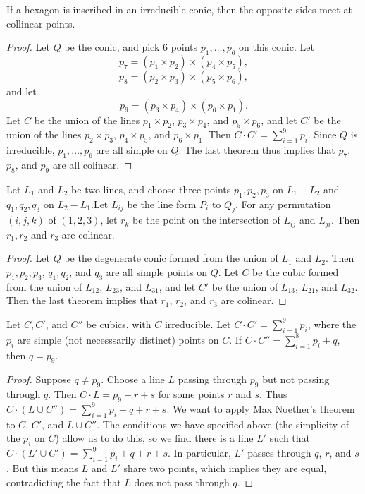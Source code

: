 \begin{corollary}
    If a hexagon is inscribed in an irreducible conic, then the opposite sides meet at collinear points.
\end{corollary}
\begin{proof}
    Let $Q$ be the conic, and pick 6 points $p_1,\dots,p_6$ on this conic. Let
    \[ p_7 = (p_1 \times p_2) \times (p_4 \times p_5), \]
    \[ p_8 = (p_2 \times p_3) \times (p_5 \times p_6), \]
    and let
    \[ p_9 = (p_3 \times p_4) \times (p_6 \times p_1). \]
    Let $C$ be the union of the lines $p_1 \times p_2$, $p_3 \times p_4$, and $p_5 \times p_6$, and let $C'$ be the union of the lines $p_2 \times p_3$, $p_4 \times p_5$, and $p_6 \times p_1$. Then $C \cdot C' = \sum_{i = 1}^9 p_i$. Since $Q$ is irreducible, $p_1,\dots,p_6$ are all simple on $Q$. The last theorem thus implies that $p_7$, $p_8$, and $p_9$ are all colinear.
\end{proof}

\begin{corollary}
    Let $L_1$ and $L_2$ be two lines, and choose three points $p_1,p_2,p_3$ on $L_1 - L_2$ and $q_1,q_2,q_3$ on $L_2 - L_1$.Let $L_{ij}$ be the line form $P_i$ to $Q_j$. For any permutation $(i,j,k)$ of $(1,2,3)$, let $r_k$ be the point on the intersection of $L_{ij}$ and $L_{ji}$. Then $r_1,r_2$ and $r_3$ are colinear.
\end{corollary}
\begin{proof}
    Let $Q$ be the degenerate conic formed from the union of $L_1$ and $L_2$. Then $p_1,p_2,p_3$, $q_1,q_2$, and $q_3$ are all simple points on $Q$. Let $C$ be the cubic formed from the union of $L_{12}$, $L_{23}$, and $L_{31}$, and let $C'$ be the union of $L_{13}$, $L_{21}$, and $L_{32}$. Then the last theorem implies that $r_1$, $r_2$, and $r_3$ are colinear.
\end{proof}

\begin{theorem}
    Let $C,C'$, and $C''$ be cubics, with $C$ irreducible. Let $C \cdot C' = \sum_{i = 1}^9 p_i$, where the $p_i$ are simple (not necesssarily distinct) points on $C$. If $C \cdot C'' = \sum_{i = 1}^8 p_i + q$, then $q = p_9$.
\end{theorem}
\begin{proof}
    Suppose $q \neq p_9$. Choose a line $L$ passing through $p_9$ but not passing through $q$. Then $C \cdot L = p_9 + r + s$ for some points $r$ and $s$. Thus $C \cdot (L \cup C'') = \sum_{i = 1}^9 p_i + q + r + s$. We want to apply Max Noether's theorem to $C$, $C'$, and $L \cup C''$. The conditions we have specified above (the simplicity of the $p_i$ on $C$) allow us to do this, so we find there is a line $L'$ such that $C \cdot (L' \cup C') = \sum_{i = 1}^9 p_i + q + r + s$. In particular, $L'$ passes through $q$, $r$, and $s$. But this means $L$ and $L'$ share two points, which implies they are equal, contradicting the fact that $L$ does not pass through $q$.
\end{proof}

